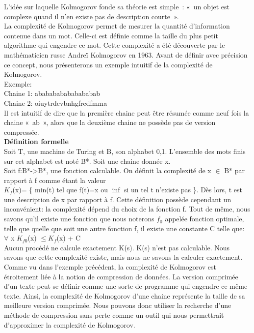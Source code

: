 \documentclass[a4paper, 10pt, titlepage]{report}
\begin{document}
L'idée sur laquelle Kolmogorov fonde sa théorie est simple : « un objet est complexe quand il n'en existe pas de description courte ». \\
La complexité de Kolmogorov permet de mesurer la quantité d’information contenue dans un mot. Celle-ci est définie comme la taille du plus petit algorithme qui engendre ce mot. Cette complexité a été découverte par le mathématicien russe Andreï Kolmogorov en 1963.
Avant de définir avec précision ce concept, nous présenterons un exemple intuitif de la complexité de Kolmogorov.\\
Exemple: \\
Chaine 1: ababababababababab \\
Chaine 2: oiuytrdcvbnhgfredfmma \\
Il est intuitif de dire que la première chaine peut être résumée comme neuf fois la chaine « ab », alors que la deuxième chaine ne possède pas de version compressée.\\
\bigbreak
\textbf{Définition formelle} \\
Soit T, une machine de Turing et B, son alphabet {0,1}. L’ensemble des mots finis sur cet alphabet est noté B*. Soit une chaine donnée x.\\
Soit f:B*->B*, une fonction calculable. On définit la complexité de x $\in$ B* par rapport à f comme étant la valeur \\
$K_f$(x)= \{ min(t) tel que f(t)=x ou $\inf$ si un tel t n’existe pas \}.
\bigbreak
Dès lors, t est une description de x par rapport à f. Cette définition possède cependant un inconvénient: la complexité dépend du choix de la fonction f. Tout de même, nous savons qu’il existe une fonction que nous noterons $f_0$ appelée fonction optimale, telle que quelle que soit une autre fonction f, il existe une constante C telle que:\\
$\forall$ x $K_{f0}$(x) $\leq K_f$(x) + C \\
Aucun procédé ne calcule exactement K(s). K(s) n'est pas calculable. Nous savons que cette complexité existe, mais nous ne savons la calculer exactement. \\
\bigbreak
Comme vu dans l’exemple précédent, la complexité de Kolmogorov est étroitement liée à la notion de compression de données. La version comprimée d’un texte peut se définir comme une sorte de programme qui engendre ce même texte. Ainsi, la complexité de Kolmogorov d’une chaine représente la taille de sa meilleure version comprimée. Nous pouvons donc utiliser la recherche d’une méthode de compression sans perte comme un outil qui nous permettrait d’approximer la complexité de Kolmogorov.
\end{document}
